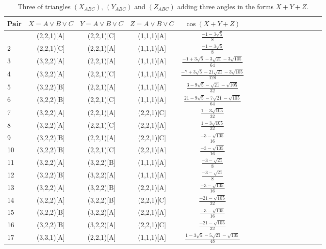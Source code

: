 \documentclass[11pt]{article}
\begin{document}
\begin{longtable}{ | p{1cm}| *{15}{c|} }
\caption{Three of triangles $(X_{ABC})$, $(Y_{ABC})$ and $(Z_{ABC})$ adding three angles 
in the forms $X+Y+Z$.}\\
\hline
Pair & $X = A \lor B \lor C$ & $Y = A \lor B \lor C$ & $Z = A \lor B \lor C$ & $\cos(X+Y+Z)$ \\
\hline\endhead
\hline\endfoot
1 & (2,2,1)[A] & (2,2,1)[C] & (1,1,1)[A] & $\frac{-1-3\sqrt{5}}{8}$\\ %
2 & (2,2,1)[C] & (2,2,1)[A] & (1,1,1)[A] & $\frac{-1-3\sqrt{5}}{8}$\\ %
3 & (3,2,2)[A] & (2,2,1)[A] & (1,1,1)[A] & $\frac{-1+3\sqrt{5}-3\sqrt{21}-3\sqrt{105}}{64}$\\ %
4 & (3,2,2)[A] & (2,2,1)[C] & (1,1,1)[A] & $\frac{-7+3\sqrt{5}-21\sqrt{21}-3\sqrt{105}}{128}$\\ %
5 & (3,2,2)[B] & (2,2,1)[A] & (1,1,1)[A] & $\frac{3-9\sqrt{5}-\sqrt{21}-\sqrt{105}}{32}$\\ %
6 & (3,2,2)[B] & (2,2,1)[C] & (1,1,1)[A] & $\frac{21-9\sqrt{5}-7\sqrt{21}-\sqrt{105}}{64}$\\ %
7 & (3,2,2)[A] & (2,2,1)[A] & (2,2,1)[C] & $\frac{1-3\sqrt{105}}{32}$\\ %
8 & (3,2,2)[A] & (2,2,1)[C] & (2,2,1)[A] & $\frac{1-3\sqrt{105}}{32}$\\ %
9 & (3,2,2)[B] & (2,2,1)[A] & (2,2,1)[C] & $\frac{-3-\sqrt{105}}{16}$\\ %
10 & (3,2,2)[B] & (2,2,1)[C] & (2,2,1)[A] & $\frac{-3-\sqrt{105}}{16}$\\ %
11 & (3,2,2)[A] & (3,2,2)[B] & (1,1,1)[A] & $\frac{-3-\sqrt{21}}{8}$\\ %
12 & (3,2,2)[B] & (3,2,2)[A] & (1,1,1)[A] & $\frac{-3-\sqrt{21}}{8}$\\ %
13 & (3,2,2)[A] & (3,2,2)[B] & (2,2,1)[A] & $\frac{-3-\sqrt{105}}{16}$\\ %
14 & (3,2,2)[A] & (3,2,2)[B] & (2,2,1)[C] & $\frac{-21-\sqrt{105}}{32}$\\ %
15 & (3,2,2)[B] & (3,2,2)[A] & (2,2,1)[A] & $\frac{-3-\sqrt{105}}{16}$\\ %
16 & (3,2,2)[B] & (3,2,2)[A] & (2,2,1)[C] & $\frac{-21-\sqrt{105}}{32}$\\ %
17 & (3,3,1)[A] & (2,2,1)[A] & (1,1,1)[A] & $\frac{1-3\sqrt{5}-5\sqrt{21}-\sqrt{105}}{48}$\\ %

\end{longtable}
\end{document}
